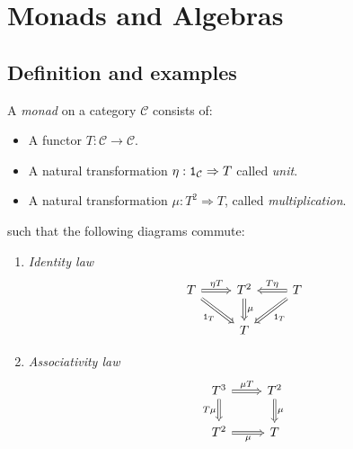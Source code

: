 
\chapter{Monads and Algebras}

\section{Definition and examples}

\begin{definition}
  A {\em monad} on a category \(\mathcal{C}\) consists of:
  \begin{itemize}[leftmargin=*]
  \item A functor \(T: \mathcal{C} \to \mathcal{C}\).
  \item A natural transformation
    \(\eta: \mathtt 1_{\mathcal{C}} \Rightarrow T\) called {\em unit}.
  \item A natural transformation \(\mu: T^2 \Rightarrow T\), called {\em
      multiplication}.
  \end{itemize}
  such that the following diagrams commute:
  \begin{enumerate}[leftmargin=*]
  \item {\em Identity law}
    \begin{equation}
      \begin{tikzcd}
        T \ar["{\eta T}", r, Rightarrow] \ar["{\id_T}", dr, swap,
        Rightarrow] & T^2 \ar["{\mu}", d, Rightarrow] &
        T \ar["{T \eta}", l, swap, Rightarrow] \ar["{\id_T}", dl, Rightarrow] \\
        & T
      \end{tikzcd}
      \label{cd:MonadAxiomI}
    \end{equation}
  \item {\em Associativity law}
    \begin{equation}
      \begin{tikzcd}
        T^3 \ar[r, "\mu T", Rightarrow] \ar["{T \mu}", d, swap, Rightarrow] & T^2
        \ar["{\mu}", d, Rightarrow] \\
        T^2 \ar["{\mu}", r, swap, Rightarrow] & T
      \end{tikzcd}
      \label{cd:MonadAxiomII}
    \end{equation}
  \end{enumerate}
\end{definition}

